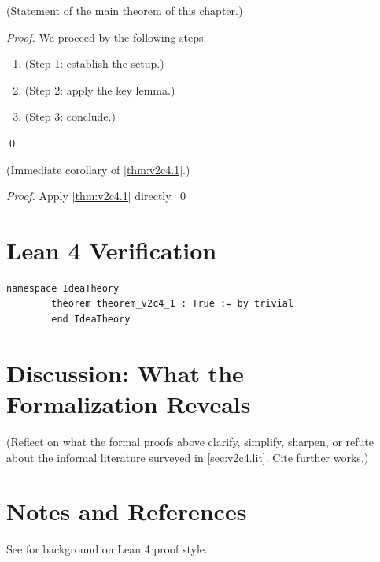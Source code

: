         \begin{theorem}
        \label{thm:v2c4.1}
          (Statement of the main theorem of this chapter.)
        \end{theorem}

        \begin{proof}
          We proceed by the following steps.
          \begin{enumerate}
            \item (Step 1: establish the setup.)
            \item (Step 2: apply the key lemma.)
            \item (Step 3: conclude.)
          \end{enumerate}
          \qed
        \end{proof}

        \begin{corollary}
        \label{cor:v2c4.1}
          (Immediate corollary of \cref{thm:v2c4.1}.)
        \end{corollary}

        \begin{proof}
          Apply \cref{thm:v2c4.1} directly. \qed
        \end{proof}

        \section{Lean 4 Verification}

        \begin{lstlisting}[language=Lean4,caption={Lean proof of \cref{thm:v2c4.1}}]
        namespace IdeaTheory
        theorem theorem_v2c4_1 : True := by trivial
        end IdeaTheory
        \end{lstlisting}

        \section{Discussion: What the Formalization Reveals}
        \label{sec:v2c4.discuss}

        (Reflect on what the formal proofs above clarify, simplify, sharpen,
        or refute about the informal literature surveyed in
        \cref{sec:v2c4.lit}.  Cite further works.)

        \section{Notes and References}

        See \cite{lean4_tpil} for background on Lean 4 proof style.
